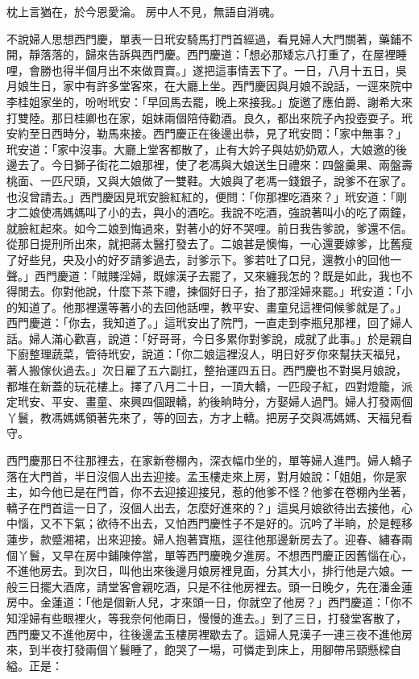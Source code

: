 枕上言猶在，於今恩愛淪。
房中人不見，無語自消魂。

不說婦人思想西門慶，單表一日玳安騎馬打門首經過，看見婦人大門關著，藥鋪不開，靜落落的，歸來告訴與西門慶。西門慶道：「想必那矮忘八打重了，在屋裡睡哩，會勝也得半個月出不來做買賣。」遂把這事情丟下了。一日，八月十五日，吳月娘生日，家中有許多堂客來，在大廳上坐。西門慶因與月娘不說話，一逕來院中李桂姐家坐的，吩咐玳安：「早回馬去罷，晚上來接我。」旋邀了應伯爵、謝希大來打雙陸。那日桂卿也在家，姐妹兩個陪侍勸酒。良久，都出來院子內投壺耍子。玳安約至日西時分，勒馬來接。西門慶正在後邊出恭，見了玳安問：「家中無事？」玳安道：「家中沒事。大廳上堂客都散了，止有大妗子與姑奶奶眾人，大娘邀的後邊去了。今日獅子街花二娘那裡，使了老馮與大娘送生日禮來：四盤羹果、兩盤壽桃面、一匹尺頭，又與大娘做了一雙鞋。大娘與了老馮一錢銀子，說爹不在家了。也沒曾請去。」西門慶因見玳安臉紅紅的，便問：「你那裡吃酒來？」玳安道：「剛才二娘使馮媽媽叫了小的去，與小的酒吃。我說不吃酒，強說著叫小的吃了兩鐘，就臉紅起來。如今二娘到悔過來，對著小的好不哭哩。前日我告爹說，爹還不信。從那日提刑所出來，就把蔣太醫打發去了。二娘甚是懊悔，一心還要嫁爹，比舊瘦了好些兒，央及小的好歹請爹過去，討爹示下。爹若吐了口兒，還教小的回他一聲。」西門慶道：「賊賤淫婦，既嫁漢子去罷了，又來纏我怎的？既是如此，我也不得閒去。你對他說，什麼下茶下禮，揀個好日子，抬了那淫婦來罷。」玳安道：「小的知道了。他那裡還等著小的去回他話哩，教平安、畫童兒這裡伺候爹就是了。」西門慶道：「你去，我知道了。」這玳安出了院門，一直走到李瓶兒那裡，回了婦人話。婦人滿心歡喜，說道：「好哥哥，今日多累你對爹說，成就了此事。」於是親自下廚整理蔬菜，管待玳安，說道：「你二娘這裡沒人，明日好歹你來幫扶天福兒，著人搬傢伙過去。」次日雇了五六副扛，整抬運四五日。西門慶也不對吳月娘說，都堆在新蓋的玩花樓上。擇了八月二十日，一頂大轎，一匹段子紅，四對燈籠，派定玳安、平安、畫童、來興四個跟轎，約後晌時分，方娶婦人過門。婦人打發兩個丫鬟，教馮媽媽領著先來了，等的回去，方才上轎。把房子交與馮媽媽、天福兒看守。

西門慶那日不往那裡去，在家新卷棚內，深衣幅巾坐的，單等婦人進門。婦人轎子落在大門首，半日沒個人出去迎接。孟玉樓走來上房，對月娘說：「姐姐，你是家主，如今他已是在門首，你不去迎接迎接兒，惹的他爹不怪？他爹在卷棚內坐著，轎子在門首這一日了，沒個人出去，怎麼好進來的？」這吳月娘欲待出去接他，心中惱，又不下氣；欲待不出去，又怕西門慶性子不是好的。沉吟了半晌，於是輕移蓮步，款蹙湘裙，出來迎接。婦人抱著寶瓶，逕往他那邊新房去了。迎春、繡春兩個丫鬟，又早在房中鋪陳停當，單等西門慶晚夕進房。不想西門慶正因舊惱在心，不進他房去。到次日，叫他出來後邊月娘房裡見面，分其大小，排行他是六娘。一般三日擺大酒席，請堂客會親吃酒，只是不往他房裡去。頭一日晚夕，先在潘金蓮房中。金蓮道：「他是個新人兒，才來頭一日，你就空了他房？」西門慶道：「你不知淫婦有些眼裡火，等我奈何他兩日，慢慢的進去。」到了三日，打發堂客散了，西門慶又不進他房中，往後邊孟玉樓房裡歇去了。這婦人見漢子一連三夜不進他房來，到半夜打發兩個丫鬟睡了，飽哭了一場，可憐走到床上，用腳帶吊頸懸樑自縊。正是：

